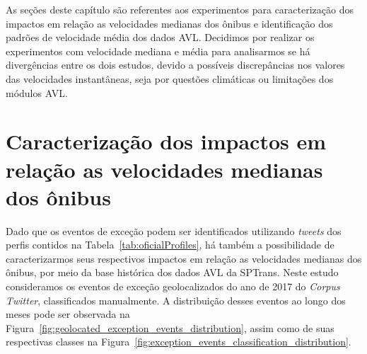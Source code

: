 \documentclass[
	12pt,				%
	oneside,			%
	a4paper,			%
	english,			%
	brazil				%
	]{abntex2ppgsi}
\begin{document}
{{{As seções deste capítulo são referentes aos experimentos para caracterização dos impactos em relação as velocidades medianas dos ônibus e identificação dos padrões de velocidade média dos dados AVL. Decidimos por realizar os experimentos com velocidade mediana e média para analisarmos se há divergências entre os dois estudos, devido a possíveis discrepâncias nos valores das velocidades instantâneas, seja por questões climáticas ou limitações dos módulos AVL.

\section{Caracterização dos impactos em relação as velocidades medianas dos ônibus}

Dado que os eventos de exceção podem ser identificados utilizando \textit{tweets} dos perfis contidos na Tabela~\ref{tab:oficialProfiles}, há também a possibilidade de caracterizarmos seus respectivos impactos em relação as velocidades medianas dos ônibus, por meio da base histórica dos dados AVL da SPTrans.  Neste estudo consideramos os eventos de exceção geolocalizados do ano de 2017 do \textit{Corpus Twitter}, classificados manualmente. A distribuição desses eventos ao longo dos meses pode ser observada  na Figura~\ref{fig:geolocated_exception_events_distribution}, assim como de suas respectivas classes na Figura~\ref{fig:exception_events_classification_distribution}.



}}}
\end{document}
